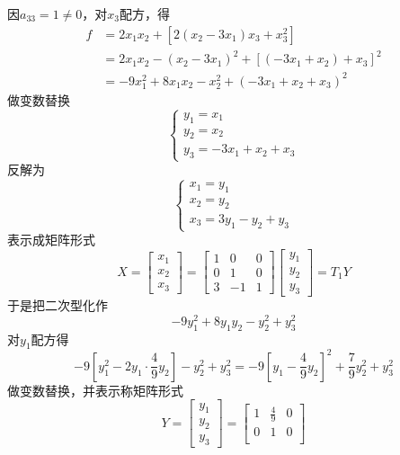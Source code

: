 \documentclass[11pt]{article}
\begin{document}
\begin{examplle}[]
因\(a_{33}=1\neq0\)，对\(x_3\)配方，得
\begin{align*}
f&=2x_1x_2+[2(x_2-3x_1)x_3+x_3^2]\\
&=2x_1x_2-(x_2-3x_1)^2+[(-3x_1+x_2)+x_3]^2\\
&=-9x_1^2+8x_1x_2-x_2^2+(-3x_1+x_2+x_3)^2
\end{align*}
做变数替换
\begin{equation*}
\begin{cases}
y_1=x_1\\
y_2=x_2\\
y_3=-3x_1+x_2+x_3
\end{cases}
\end{equation*}
反解为
\begin{equation*}
\begin{cases}
x_1=y_1\\
x_2=y_2\\
x_3=3y_1-y_2+y_3
\end{cases}
\end{equation*}
表示成矩阵形式
\begin{equation*}
X=
\begin{bmatrix}
x_1\\x_2\\x_3
\end{bmatrix}=
\begin{bmatrix}
1&0&0\\0&1&0\\3&-1&1
\end{bmatrix}
\begin{bmatrix}
y_1\\y_2\\y_3
\end{bmatrix}=T_1Y
\end{equation*}
于是把二次型化作
\begin{equation*}
-9y_1^2+8y_1y_2-y_2^2+y_3^2
\end{equation*}
对\(y_1\)配方得
\begin{equation*}
-9[y_1^2-2y_1\cdot\frac{4}{9}y_2]-y_2^2+y_3^2=
-9[y_1-\frac{4}{9}y_2]^2+\frac{7}{9}y_2^2+y_3^2
\end{equation*}
做变数替换，并表示称矩阵形式
\begin{equation*}
Y=
\begin{bmatrix}
y_1\\y_2\\y_3
\end{bmatrix}=
\begin{bmatrix}
1&\frac{4}{9}&0\\
0&1&0\\

\end{bmatrix}
\end{equation*}
\end{examplle}
\end{document}
